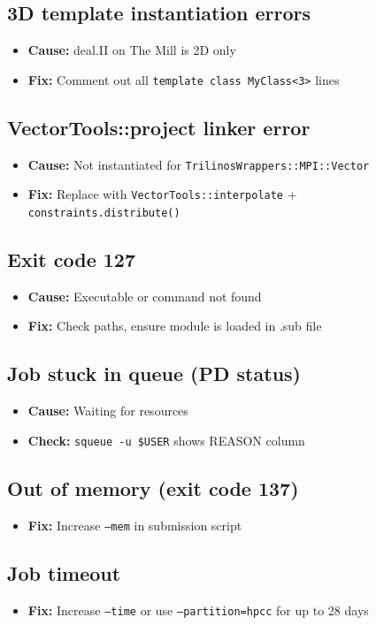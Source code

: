 \documentclass[11pt,a4paper]{article}
\begin{document}
\subsection{3D template instantiation errors}
\begin{itemize}
    \item \textbf{Cause:} deal.II on The Mill is 2D only
    \item \textbf{Fix:} Comment out all \texttt{template class MyClass<3>} lines
\end{itemize}
\subsection{VectorTools::project linker error}
\begin{itemize}
    \item \textbf{Cause:} Not instantiated for \texttt{TrilinosWrappers::MPI::Vector}
    \item \textbf{Fix:} Replace with \texttt{VectorTools::interpolate} + \texttt{constraints.distribute()}
\end{itemize}
\subsection{Exit code 127}
\begin{itemize}
    \item \textbf{Cause:} Executable or command not found
    \item \textbf{Fix:} Check paths, ensure module is loaded in .sub file
\end{itemize}
\subsection{Job stuck in queue (PD status)}
\begin{itemize}
    \item \textbf{Cause:} Waiting for resources
    \item \textbf{Check:} \texttt{squeue -u \$USER} shows REASON column
\end{itemize}
\subsection{Out of memory (exit code 137)}
\begin{itemize}
    \item \textbf{Fix:} Increase \texttt{--mem} in submission script
\end{itemize}
\subsection{Job timeout}
\begin{itemize}
    \item \textbf{Fix:} Increase \texttt{--time} or use \texttt{--partition=hpcc} for up to 28 days
\end{itemize}
\end{document}
